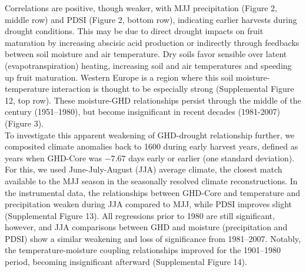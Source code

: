 \documentclass[final]{nature}
\begin{document}
\indent Correlations are positive, though weaker, with MJJ precipitation (Figure 2, middle row) and PDSI (Figure 2, bottom row), indicating earlier harvests during drought conditions. This may be due to direct drought impacts on fruit maturation by increasing abscisic acid production\cite{webb2012} or indirectly through feedbacks between soil moisture and air temperature. Dry soils favor sensible over latent (evapotranspiration) heating, increasing soil and air temperatures and speeding up fruit maturation. Western Europe is a region where this soil moisture-temperature interaction is thought to be especially strong\cite{Seneviratne2006} (Supplemental Figure 12, top row). These moisture-GHD relationships persist through the middle of the century (1951--1980), but become insignificant in recent decades (1981-2007) (Figure 3).\\
\indent To investigate this apparent weakening of GHD-drought relationship further, we composited climate anomalies back to 1600 during early harvest years, defined as years when GHD-Core was $-7.67$ days early or earlier (one standard deviation). For this, we used June-July-August (JJA) average climate, the closest match available to the MJJ season in the seasonally resolved climate reconstructions. In the instrumental data, the relationships between GHD-Core and temperature and precipitation weaken during JJA compared to MJJ, while PDSI improves slight (Supplemental Figure 13). All regressions prior to 1980 are still significant, however, and JJA comparisons between GHD and moisture (precipitation and PDSI) show a similar weakening and loss of significance from 1981--2007. Notably, the temperature-moisture coupling relationships improved for the 1901--1980 period, becoming insignificant afterward (Supplemental Figure 14).\\ 
\end{document}

